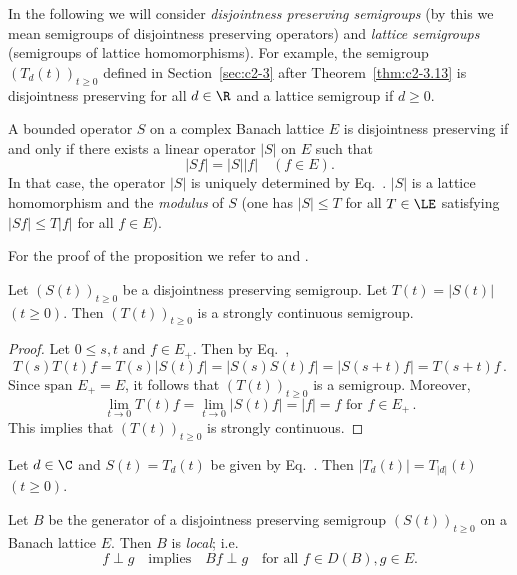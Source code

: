 In the following we will consider \emph{disjointness preserving semigroups}
(by this we mean semigroups of disjointness preserving operators) and
\emph{lattice semigroups} (\ie semigroups of lattice homomorphisms). For
example, the semigroup $(T_{d}(t))_{t \geq 0}$ defined in Section~\ref{sec:c2-3} after Theorem~\ref{thm:c2-3.13}  is disjointness preserving for all $d \in \R$ and a lattice semigroup if\/ $d \geq 0$.
\begin{proposition}\label{prop:c2-5.1}
A bounded operator $S$ on a complex Banach lattice $E$ is disjointness preserving if and only if there exists a linear operator $|S|$ on $E$ such that
\begin{equation}\label{eq:c2-5.3}
|Sf| = |S||f| \quad (f \in E).
\end{equation}
In that case, the operator $|S|$ is uniquely determined by Eq.~.
$|S|$ is a lattice homomorphism and the \emph{modulus} of\/ $S$ (\ie one has
$|S| \leq T$ for all $T \in \LE$ satisfying $|Sf| \leq T|f|$ for all $f \in E$).
\end{proposition}
For the proof of the proposition we refer to \textcite{arendt:1983} and \textcite{depagter:1984}.
\begin{proposition}\label{prop:c2-5.2}
Let $(S(t))_{t \geq 0}$ be a disjointness preserving semigroup. 
Let $T(t) = |S(t)|$ $(t \geq 0)$. 
Then $(T(t))_{t \geq 0}$ is a strongly continuous semigroup.
\end{proposition}
\begin{proof}
Let $0 \leq s,t$ and $f \in E_{+}$. 
Then by Eq.~, 
\[
T(s)T(t)f = T(s)|S(t)f| = |S(s)S(t)f| = |S(s+t)f| = T(s+t)f\,.
\]
Since $\text{span } E_{+} = E$, it follows that $(T(t))_{t \geq 0}$ is a semigroup. 
Moreover, 
\[
\lim_{t \to 0} T(t)f = \lim_{t \to 0} |S(t)f| = |f| = f 
\text{ for } f \in E_{+}\,.
\]
This implies that $(T(t))_{t \geq 0}$ is strongly continuous.
\end{proof}
\begin{example}\label{ex:c2-5.3}
Let $d \in \C$ and $S(t) = T_{d}(t)$ be given by Eq.~. 
Then $|T_{d}(t)| = T_{|d|}(t)$ $(t \geq 0)$.
\end{example}
\begin{proposition}\label{prop:c2-5.4}
Let $B$ be the generator of a disjointness preserving semigroup $(S(t))_{t \geq 0}$ on a Banach lattice $E$. 
Then $B$ is \emph{local}; i.e.
\begin{equation}\label{eq:c2-5.4}
f \perp g \quad \text{implies} \quad Bf \perp g \quad \text{for all } f \in D(B), g \in E.
\end{equation}
\end{proposition}
